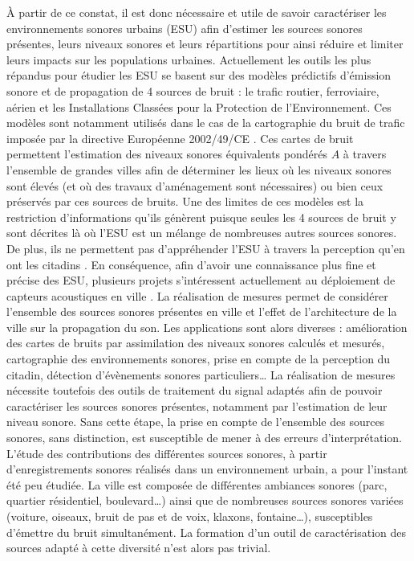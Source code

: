 À partir de ce constat, il est donc nécessaire et utile de savoir caractériser les environnements sonores urbains (ESU) afin d'estimer les sources sonores présentes, leurs niveaux sonores et leurs répartitions pour ainsi réduire et limiter leurs impacts sur les populations urbaines.
Actuellement les outils les plus répandus pour étudier les ESU se basent sur des modèles prédictifs d'émission sonore et de propagation de 4 sources de bruit : le trafic routier, ferroviaire, aérien et les Installations Classées pour la Protection de l'Environnement. Ces modèles sont notamment utilisés dans le cas de la cartographie du bruit de trafic imposée par la directive Européenne 2002/49/CE \cite{directive}. Ces cartes de bruit permettent l'estimation des niveaux sonores équivalents pondérés $A$ à travers l'ensemble de grandes villes afin de déterminer les lieux où les niveaux sonores sont élevés (et où des travaux d'aménagement sont nécessaires) ou bien ceux préservés par ces sources de bruits. Une des limites  de ces modèles est la restriction d'informations qu'ils génèrent puisque seules les 4 sources de bruit y sont décrites là où l'ESU est un mélange de nombreuses autres sources sonores. De plus, ils ne permettent pas d'appréhender l'ESU à travers la perception qu'en ont les citadins \cite{aumond2017modeling}.
En conséquence, afin d'avoir une connaissance plus fine et précise des ESU, plusieurs projets s'intéressent actuellement au déploiement de capteurs acoustiques en ville \cite{picaut2017characterization,zambon2017life}. La réalisation de mesures permet de considérer l'ensemble des sources sonores présentes en ville et l'effet de l'architecture de la ville sur la propagation du son. Les applications sont alors diverses : amélioration des cartes de bruits par assimilation des niveaux sonores calculés et mesurés, cartographie des environnements sonores, prise en compte de la perception du citadin, détection d'évènements sonores particuliers\dots{}
La réalisation de mesures nécessite toutefois des outils de traitement du signal adaptés afin de pouvoir caractériser les sources sonores présentes, notamment par l'estimation de leur niveau sonore. Sans cette étape, la prise en compte de l'ensemble des sources sonores, sans distinction, est susceptible de mener à des erreurs d'interprétation. L'étude des contributions des différentes sources sonores, à partir d'enregistrements sonores réalisés dans un environnement urbain, a pour l'instant été peu étudiée.
La ville est composée de différentes ambiances sonores (parc, quartier résidentiel, boulevard\dots{}) ainsi que de nombreuses sources sonores variées (voiture, oiseaux, bruit de pas et de voix, klaxons, fontaine\dots{}), susceptibles d'émettre du bruit simultanément. La formation d'un outil de caractérisation des sources adapté à cette diversité n'est alors pas trivial.

